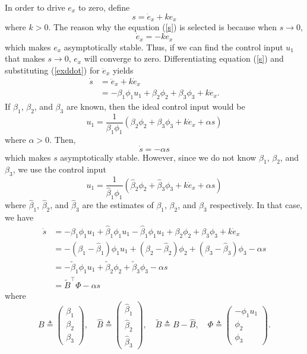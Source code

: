 In order to drive $e_x$ to zero, define
\begin{equation}
s=\dot{e}_x+ke_x
\label{s}
\end{equation} where $k>0$. The reason why the equation (\ref{s}) is selected is because when $s\rightarrow0$, 
\begin{equation}
\dot{e}_x=-ke_x
\end{equation} which makes $e_x$ asymptotically stable. Thus, if we can find the control input $u_1$ that makes $s\rightarrow0$, $e_x$ will converge to zero. Differentiating equation (\ref{s}) and substituting (\ref{exddot}) for $\ddot{e}_x$ yields
\begin{align}
\dot{s}&=\ddot{e}_x+k\dot{e}_x
\\&=-\beta_1\phi_1u_1+\beta_2\phi_2+\beta_3\phi_3+k\dot{e}_x.
\label{sdot}
\end{align}
If $\beta_1$, $\beta_2$, and $\beta_3$ are known, then the ideal control input would be 
\begin{equation}
u_1=\frac{1}{\beta_1\phi_1}(\beta_2\phi_2+\beta_3\phi_3+k\dot{e}_x+\alpha s)
\end{equation}
where $\alpha>0$.
Then, 
\begin{equation}
\dot{s}=-\alpha s
\end{equation} 
which makes $s$ asymptotically stable. 
However, since we do not know $\beta_1$, $\beta_2$, and $\beta_3$, we use the control input
\begin{equation}
u_1=\frac{1}{\hat{\beta}_1\phi_1}(\hat{\beta}_2\phi_2+\hat{\beta}_3\phi_3+k\dot{e}_x+\alpha s)
\label{actualcontrol}
\end{equation}
where $\hat{\beta}_1$, $\hat{\beta}_2$, and $\hat{\beta}_3$ are the estimates of $\beta_1$, $\beta_2$, and $\beta_3$ respectively. 
In that case, we have
\begin{align}
\dot{s}&=-\beta_1\phi_1u_1+\hat{\beta}_1\phi_1u_1-\hat{\beta}_1\phi_1u_1+\beta_2\phi_2+\beta_3\phi_3+k\dot{e}_x
\label{sdot1}
\\&=-(\beta_1-\hat{\beta}_1)\phi_1u_1+(\beta_2-\hat{\beta}_2)\phi_2+(\beta_3-\hat{\beta}_3)\phi_3-\alpha s
\\&=-\tilde{\beta}_1\phi_1u_1+\tilde{\beta}_2\phi_2+\tilde{\beta}_3\phi_3-\alpha s
\\&=\tilde{B}^\top\Phi-\alpha s
\label{sdot2}
\end{align}
where 
\begin{equation}
B\triangleq\begin{pmatrix}
\beta_1 \\ \beta_2 \\ \beta_3
\end{pmatrix}, \quad
\hat{B}\triangleq\begin{pmatrix} \hat{\beta}_1 \\ \hat{\beta}_2 \\ \hat{\beta}_3 \end{pmatrix}, \quad
\tilde{B}\triangleq B-\hat{B}, \quad 
\Phi \triangleq \begin{pmatrix} -\phi_1u_1 \\ \phi_2 \\ \phi_3 \end{pmatrix}.
\end{equation}
